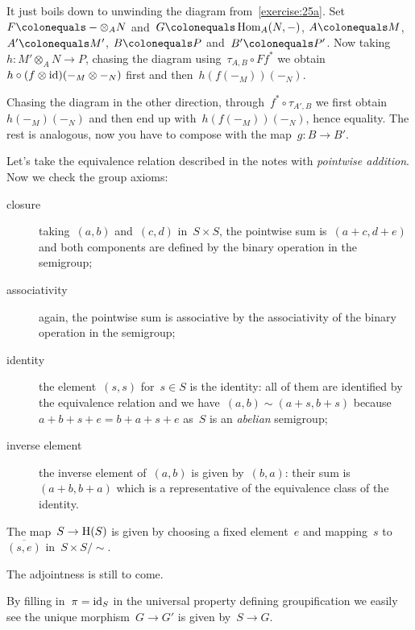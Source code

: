 \begin{exercise}
  \label{exercise:25d}
  It just boils down to unwinding the diagram from~\autoref{exercise:25a}. Set~$F\colonequals-\otimes_A N$ and~$G\colonequals\Hom_A(N,-)$, $A\colonequals M$, $A'\colonequals M'$, $B\colonequals P$ and~$B'\colonequals P'$. Now taking~$h\colon M'\otimes_A N\to P$, chasing the diagram using~$\tau_{A,B}\circ Ff^*$ we obtain~$h\circ (f\otimes\mathrm{id})(-_M\otimes-_N)$ first and then~$h(f(-_M))(-_N)$.

  Chasing the diagram in the other direction, through~$f^*\circ\tau_{A',B}$ we first obtain~$h(-_M)(-_N)$ and then end up with~$h(f(-_M))(-_N)$, hence equality. The rest is analogous, now you have to compose with the map~$g\colon B\to B'$.
\end{exercise}

\begin{exercise} %
  Let's take the equivalence relation described in the notes with \emph{pointwise addition}. Now we check the group axioms:
  \begin{description}
    \item[closure] taking~$(a,b)$ and~$(c,d)$ in~$S\times S$, the pointwise sum is~$(a+c,d+e)$ and both components are defined by the binary operation in the semigroup;
    \item[associativity] again, the pointwise sum is associative by the associativity of the binary operation in the semigroup;
    \item[identity] the element~$(s,s)$ for~$s\in S$ is the identity: all of them are identified by the equivalence relation and we have~$(a,b)\sim(a+s,b+s)$ because~$a+b+s+e=b+a+s+e$ as~$S$ is an \emph{abelian} semigroup;
    \item[inverse element] the inverse element of~$(a,b)$ is given by~$(b,a)$: their sum is~$(a+b,b+a)$ which is a representative of the equivalence class of the identity.
  \end{description}

  The map~$S\to\mathrm{H}(S)$ is given by choosing a fixed element~$e$ and mapping~$s$ to~$\overline{(s,e)}$ in~$S\times S/{\sim}$.

  The adjointness is still to come.
\end{exercise}

\begin{exercise}
  By filling in~$\pi=\mathrm{id}_S$ in the universal property defining groupification we easily see the unique morphism~$G\to G'$ is given by~$S\to G$.
\end{exercise}

